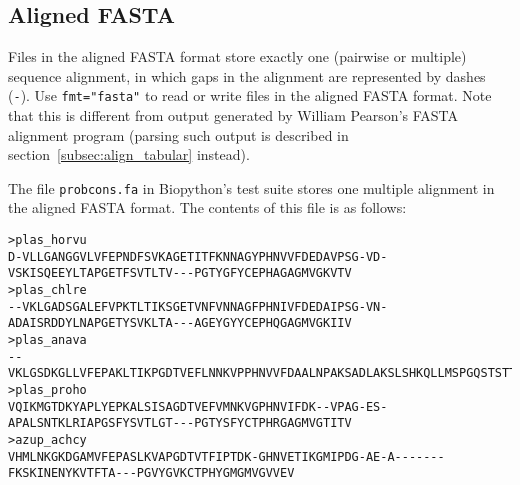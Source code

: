 \subsection{Aligned FASTA}
\label{subsec:align_fasta}

Files in the aligned FASTA format store exactly one (pairwise or multiple) sequence alignment, in which gaps in the alignment are represented by dashes (\verb|-|). Use \verb|fmt="fasta"| to read or write files in the aligned FASTA format. Note that this is different from output generated by William Pearson's FASTA alignment program (parsing such output is described in section~\ref{subsec:align_tabular} instead).

The file \verb+probcons.fa+ in Biopython's test suite stores one multiple alignment in the aligned FASTA format. The contents of this file is as follows:
\begin{verbatim}
>plas_horvu
D-VLLGANGGVLVFEPNDFSVKAGETITFKNNAGYPHNVVFDEDAVPSG-VD-VSKISQEEYLTAPGETFSVTLTV---PGTYGFYCEPHAGAGMVGKVTV
>plas_chlre
--VKLGADSGALEFVPKTLTIKSGETVNFVNNAGFPHNIVFDEDAIPSG-VN-ADAISRDDYLNAPGETYSVKLTA---AGEYGYYCEPHQGAGMVGKIIV
>plas_anava
--VKLGSDKGLLVFEPAKLTIKPGDTVEFLNNKVPPHNVVFDAALNPAKSADLAKSLSHKQLLMSPGQSTSTTFPADAPAGEYTFYCEPHRGAGMVGKITV
>plas_proho
VQIKMGTDKYAPLYEPKALSISAGDTVEFVMNKVGPHNVIFDK--VPAG-ES-APALSNTKLRIAPGSFYSVTLGT---PGTYSFYCTPHRGAGMVGTITV
>azup_achcy
VHMLNKGKDGAMVFEPASLKVAPGDTVTFIPTDK-GHNVETIKGMIPDG-AE-A-------FKSKINENYKVTFTA---PGVYGVKCTPHYGMGMVGVVEV
\end{verbatim}

